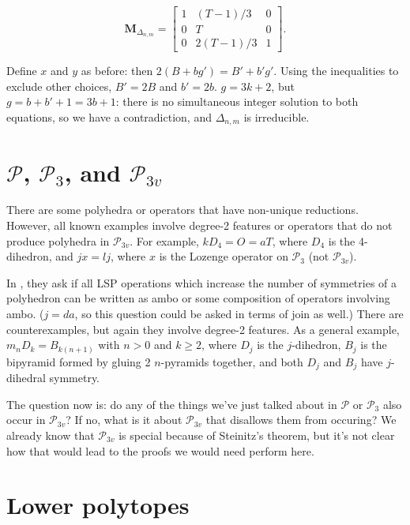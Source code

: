 \documentclass[12pt]{amsart}%
\begin{document}
\begin{equation}
   \mathbf{M}_{\Delta_{n,m}} = \begin{bmatrix}
          1 & (T-1)/3 & 0 \\
          0 & T & 0 \\
          0 & 2(T-1)/3 & 1 \end{bmatrix}.
\end{equation}

Define $x$ and $y$ as before: then $2(B+bg') = B'+b'g'$. Using the
inequalities to exclude other choices, $B' = 2B$ and $b' = 2b$.
$g = 3k + 2$, but $g = b+ b' + 1 = 3b+1$:
there is no simultaneous integer solution to both equations,
so we have a contradiction, and $\Delta_{n,m}$ is irreducible.

\section{$\mathcal{P}$, $\mathcal{P}_{3}$, and $\mathcal{P}_{3v}$}

There are some polyhedra or operators that have non-unique reductions.
However, all known examples involve degree-2 features or operators that
do not produce polyhedra in $\mathcal{P}_{3v}$. For example,
$kD_4 = O = aT$, where $D_4$ is the 4-dihedron, and $jx = lj$, where
$x$ is the Lozenge operator on $\mathcal{P}_{3}$ (not $\mathcal{P}_{3v}$).

In \cite{brinkmann}, they ask if all LSP operations which increase the number
of symmetries of a polyhedron can be written as ambo or some composition of
operators involving ambo. ($j=da$, so this question could be asked in terms of
join as well.) There are counterexamples, but again they involve degree-2
features. As a general example, $m_n D_k = B_{k(n+1)}$ with $n>0$ and
$k\ge 2$, where $D_j$ is the $j$-dihedron,
$B_j$ is the bipyramid formed by gluing 2 $n$-pyramids together,
and both $D_j$ and $B_j$ have $j$-dihedral symmetry.

The question now is: do any of the things we've just talked about in
$\mathcal{P}$ or $\mathcal{P}_{3}$ also occur in $\mathcal{P}_{3v}$? If no,
what is it about $\mathcal{P}_{3v}$ that disallows them from occuring? We
already know that $\mathcal{P}_{3v}$ is special because of Steinitz's theorem,
but it's not clear how that would lead to the proofs we would need perform
here.

\section{Lower polytopes}
\end{document}
